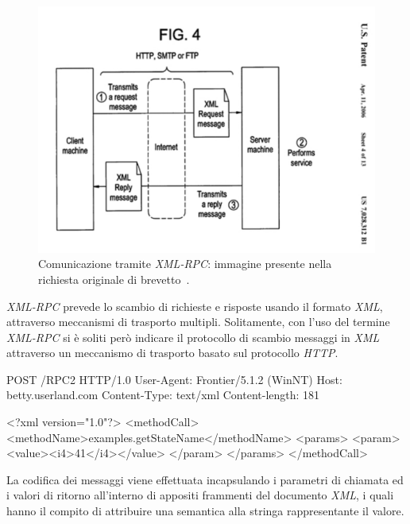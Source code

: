 \begin{figure}[h]
\centering
\includegraphics[scale=0.5, viewport=0 0 646 440]{Immagini/Capitolo2/XMLRPC-patent.pdf}
\caption[Comunicazione tramite \emph{XML-RPC}]{Comunicazione tramite \emph{XML-RPC}: immagine presente nella richiesta originale di brevetto~\cite{MERRICK:2006:misc}.}\label{fig:xmlrpc-patent}
\end{figure}

\emph{XML-RPC} prevede lo scambio di richieste e risposte usando il formato \emph{XML}, attraverso meccanismi di trasporto multipli. Solitamente, con l'uso del termine \emph{XML-RPC} si è soliti però indicare il protocollo di scambio messaggi in \emph{XML} attraverso un meccanismo di trasporto basato sul protocollo \emph{HTTP}.

\begin{program}
\begin{verbatimtab}

POST /RPC2 HTTP/1.0
User-Agent: Frontier/5.1.2 (WinNT)
Host: betty.userland.com
Content-Type: text/xml
Content-length: 181


<?xml version="1.0"?>
<methodCall>
   <methodName>examples.getStateName</methodName>
   <params>
      <param>
         <value><i4>41</i4></value>
         </param>
      </params>
   </methodCall>
\end{verbatimtab}
\caption{Esempio di chiamata ad una procedura remota usando \emph{XML-RPC over HTTP}}\label{code:xmlrpc-request}
\end{program}

La codifica dei messaggi viene effettuata incapsulando i parametri di chiamata ed i valori di ritorno all'interno di appositi frammenti del documento \emph{XML}, i quali hanno il compito di attribuire una semantica alla stringa rappresentante il valore.

